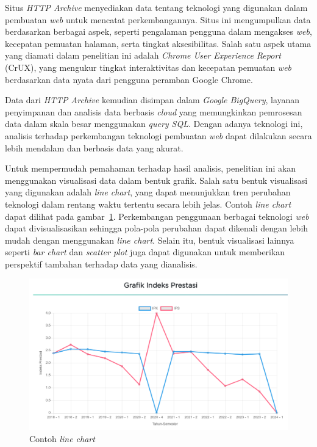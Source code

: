 \documentclass[a4paper,twoside]{article}
\newcommand{\web}{\textit{web}\xspace}
\begin{document}
Situs \textit{HTTP Archive} menyediakan data tentang teknologi yang digunakan dalam pembuatan \web untuk mencatat perkembangannya. Situs ini mengumpulkan data berdasarkan berbagai aspek, seperti pengalaman pengguna dalam mengakses \web, kecepatan pemuatan halaman, serta tingkat aksesibilitas. Salah satu aspek utama yang diamati dalam penelitian ini adalah \textit{Chrome User Experience Report} (CrUX), yang mengukur tingkat interaktivitas dan kecepatan pemuatan \web berdasarkan data nyata dari pengguna peramban Google Chrome.

Data dari \textit{HTTP Archive} kemudian disimpan dalam \textit{Google BigQuery}, layanan penyimpanan dan analisis data berbasis \textit{cloud} yang memungkinkan pemrosesan data dalam skala besar menggunakan \textit{query SQL}. Dengan adanya teknologi ini, analisis terhadap perkembangan teknologi pembuatan \web dapat dilakukan secara lebih mendalam dan berbasis data yang akurat.

Untuk mempermudah pemahaman terhadap hasil analisis, penelitian ini akan menggunakan visualisasi data dalam bentuk grafik. Salah satu bentuk visualisasi yang digunakan adalah \textit{line chart}, yang dapat menunjukkan tren perubahan teknologi dalam rentang waktu tertentu secara lebih jelas. Contoh \textit{line chart} dapat dilihat pada gambar~\ref{fig:contohlinechart}.
Perkembangan penggunaan berbagai teknologi \web dapat divisualisasikan sehingga pola-pola perubahan dapat dikenali dengan lebih mudah dengan menggunakan \textit{line chart}. Selain itu, bentuk visualisasi lainnya seperti \textit{bar chart} dan \textit{scatter plot} juga dapat digunakan untuk memberikan perspektif tambahan terhadap data yang dianalisis.

\begin{figure}[]
        \centering
        \includegraphics[width=0.5\linewidth]{Gambar/ContohLineChart.png}
        \caption{Contoh \textit{line chart}}
        \label{fig:contohlinechart}
    \end{figure}
\end{document}
